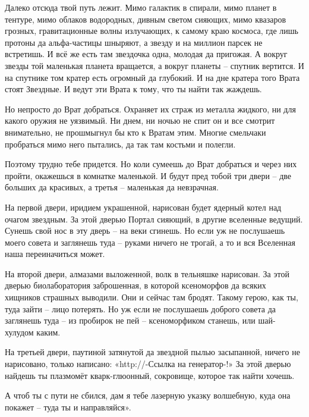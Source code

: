 \documentclass[ebook,oneside,final,openright]{memoir}
\begin{document}
\par
Далеко отсюда твой путь лежит. Мимо галактик в спирали, мимо планет в тентуре, мимо облаков водородных, дивным светом сияющих, мимо квазаров грозных, гравитационные волны излучающих, к самому краю космоса, где лишь протоны да альфа-частицы шныряют, а звезду и на миллион парсек не встретишь. И всё же есть там звездочка одна, молодая да пригожая. А вокруг звезды той маленькая планета вращается, а вокруг планеты – спутник вертится. И на спутнике том кратер есть огромный да глубокий. И на дне кратера того Врата стоят Звездные. И ведут эти Врата к тому, что ты найти так жаждешь.\par
\par
Но непросто до Врат добраться. Охраняет их страж из металла жидкого, ни для какого оружия не уязвимый. Ни днем, ни ночью не спит он и все смотрит внимательно, не прошмыгнул бы кто к Вратам этим. Многие смельчаки пробраться мимо него пытались, да так там костьми и полегли.\par
\par
Поэтому трудно тебе придется. Но коли сумеешь до Врат добраться и через них пройти, окажешься в комнатке маленькой. И будут пред тобой три двери – две больших да красивых, а третья – маленькая да невзрачная.\par
\par
На первой двери, иридием украшенной, нарисован будет ядерный котел над очагом звездным. За этой дверью Портал сияющий, в другие вселенные ведущий. Сунешь свой нос в эту дверь – на веки сгинешь. Но если уж не послушаешь моего совета и заглянешь туда – руками ничего не трогай, а то и вся Вселенная наша переиначиться может.\par
\par
На второй двери, алмазами выложенной, волк в тельняшке нарисован. За этой дверью биолаборатория заброшенная, в которой ксеноморфов да всяких хищников страшных выводили. Они и сейчас там бродят. Такому герою, как ты, туда зайти – лицо потерять. Но уж если не послушаешь доброго совета да заглянешь туда – из пробирок не пей – ксеноморфиком станешь, или шай-хулудом каким.\par
\par
На третьей двери, паутиной затянутой да звездной пылью засыпанной, ничего не нарисовано, только написано: «http://-Ссылка на генератор-!» За этой дверью найдешь ты плазмомёт кварк-глюонный, сокровище, которое так найти хочешь.\par
\par
А чтоб ты с пути не сбился, дам я тебе лазерную указку волшебную, куда она покажет – туда ты и направляйся».\par
\end{document}
